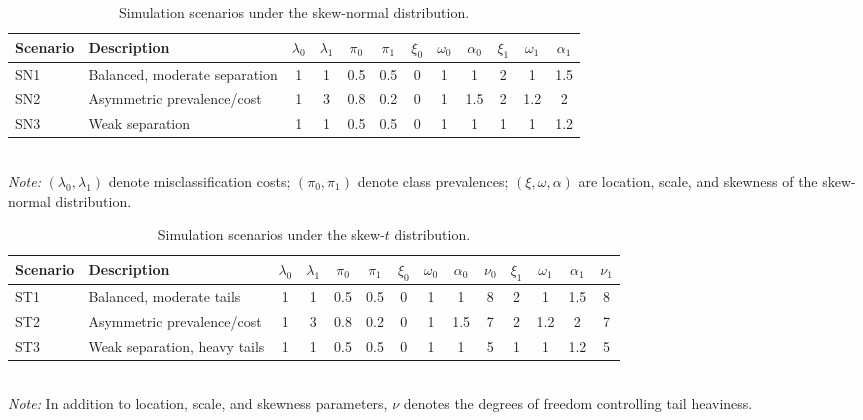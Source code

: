 \documentclass[11pt,a4paper]{article}
\theoremstyle{definition}
\theoremstyle{remark}
\newcommand{\1}{\mathbf{1}}
\begin{document}
\begin{table}[ht]
\centering
\caption{Simulation scenarios under the skew-normal distribution.}
\label{tab:scenario-metadata-sn}
\small
\setlength{\tabcolsep}{4pt}
\begin{tabular}{@{}llcccccccccc@{}}
\toprule
\textbf{Scenario} & \textbf{Description} & $\lambda_0$ & $\lambda_1$ &
  $\pi_0$ & $\pi_1$ & $\xi_0$ & $\omega_0$ & $\alpha_0$ &
  $\xi_1$ & $\omega_1$ & $\alpha_1$ \\
\midrule
SN1 & Balanced, moderate separation & 1 & 1 & 0.5 & 0.5 & 0 & 1 & 1 & 2 & 1 & 1.5 \\
SN2 & Asymmetric prevalence/cost   & 1 & 3 & 0.8 & 0.2 & 0 & 1 & 1.5 & 2 & 1.2 & 2 \\
SN3 & Weak separation              & 1 & 1 & 0.5 & 0.5 & 0 & 1 & 1 & 1 & 1 & 1.2 \\
\bottomrule
\end{tabular}
\medskip\\
{\footnotesize\textit{Note:} $(\lambda_0,\lambda_1)$ denote misclassification costs;
$(\pi_0,\pi_1)$ denote class prevalences; $(\xi,\omega,\alpha)$ are
location, scale, and skewness of the skew-normal distribution.}
\end{table}

\begin{table}[ht]
\centering
\caption{Simulation scenarios under the skew-$t$ distribution.}
\label{tab:scenario-metadata-st}
\small
\setlength{\tabcolsep}{3pt}
\begin{tabular}{@{}llcccccccccccc@{}}
\toprule
\textbf{Scenario} & \textbf{Description} & $\lambda_0$ & $\lambda_1$ &
  $\pi_0$ & $\pi_1$ & $\xi_0$ & $\omega_0$ & $\alpha_0$ & $\nu_0$ &
  $\xi_1$ & $\omega_1$ & $\alpha_1$ & $\nu_1$ \\
\midrule
ST1 & Balanced, moderate tails      & 1 & 1 & 0.5 & 0.5 & 0 & 1 & 1 & 8 & 2 & 1 & 1.5 & 8 \\
ST2 & Asymmetric prevalence/cost    & 1 & 3 & 0.8 & 0.2 & 0 & 1 & 1.5 & 7 & 2 & 1.2 & 2 & 7 \\
ST3 & Weak separation, heavy tails  & 1 & 1 & 0.5 & 0.5 & 0 & 1 & 1 & 5 & 1 & 1 & 1.2 & 5 \\
\bottomrule
\end{tabular}
\medskip\\
{\footnotesize\textit{Note:} In addition to location, scale, and skewness parameters,
$\nu$ denotes the degrees of freedom controlling tail heaviness.}
\end{table}
\end{document}
